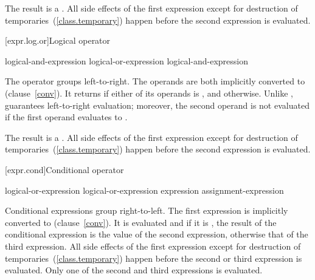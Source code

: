 \pnum
The result is a .
%
%
All side effects of the first expression except for destruction of
temporaries~(\ref{class.temporary}) happen before the second expression
is evaluated.

[expr.log.or]{Logical  operator}%
%
%
%

\begin{bnf}
\br
    logical-and-expression\br
    logical-or-expression \terminal{||} logical-and-expression
\end{bnf}

\pnum
The \tcode{||} operator groups left-to-right. The operands are both
implicitly converted to  (clause~\ref{conv}). It returns
 if either of its operands is , and
 otherwise. Unlike \tcode{|}, \tcode{||} guarantees
left-to-right evaluation; moreover, the second operand is not evaluated
if the first operand evaluates to .

\pnum
The result is a .
%
%
All side effects of the first expression except for destruction of
temporaries~(\ref{class.temporary}) happen before the second expression
is evaluated.

[expr.cond]{Conditional operator}%
%
%
%

\begin{bnf}
\br
    logical-or-expression\br
    logical-or-expression  expression \terminal{:} assignment-expression
\end{bnf}

\pnum
Conditional expressions group right-to-left. The first expression is
implicitly converted to  (clause~\ref{conv}). It is
evaluated and if it is , the result of the conditional
expression is the value of the second expression, otherwise that of the
third expression.
%
%
All side effects of the first expression except for destruction of
temporaries~(\ref{class.temporary}) happen before the second or third
expression is evaluated. Only one of the second and third expressions
is evaluated.

